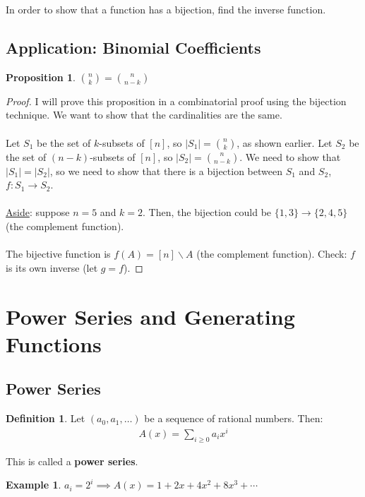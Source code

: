 \documentclass[]{article}
\newtheorem*{proposition}{Proposition}
\theoremstyle{definition}
\newtheorem*{defn}{Definition}
\newtheorem{ex}{Example}[section]
\begin{document}
			In order to show that a function has a bijection, find the inverse function.
			
			\subsection{Application: Binomial Coefficients}
				\begin{proposition}
					$\displaystyle {n \choose k} = {n \choose n - k}$
				\end{proposition}
				
				\begin{proof}
					I will prove this proposition in a combinatorial proof using the bijection technique. We want to show that the cardinalities are the same. 
					\\ \\
					Let $S_1$ be the set of $k$-subsets of $[n]$, so $|S_1| = {n \choose k}$, as shown earlier. Let $S_2$ be the set of $(n-k)$-subsets of $[n]$, so $|S_2| = {n \choose n - k}$. We need to show that $|S_1| = |S_2|$, so we need to show that there is a bijection between $S_1$ and $S_2$, $f: S_1 \to S_2$.
					\\ \\
					\underline{Aside}: suppose $n = 5$ and $k = 2$. Then, the bijection could be $\{1, 3\} \to \{2, 4, 5\}$ (the complement function).
					\\ \\
					The bijective function is $f(A) = [n]\backslash A$ (the complement function). Check: $f$ is its own inverse (let $g = f$).
				\end{proof}
				
	\section{Power Series and Generating Functions}
		\subsection{Power Series}
			\begin{defn}
					Let $(a_0, a_1, \ldots)$ be a sequence of rational numbers. Then:
					\begin{align*}
						A(x) = \sum_{i \ge 0} a_i x^i
					\end{align*}
					
					This is called a \textbf{power series}.
			\end{defn}
			
			\begin{ex}
				$a_i = 2^i \implies A(x) = 1 + 2x + 4x^2 + 8x^3 + \cdots$
			\end{ex}
\end{document}
